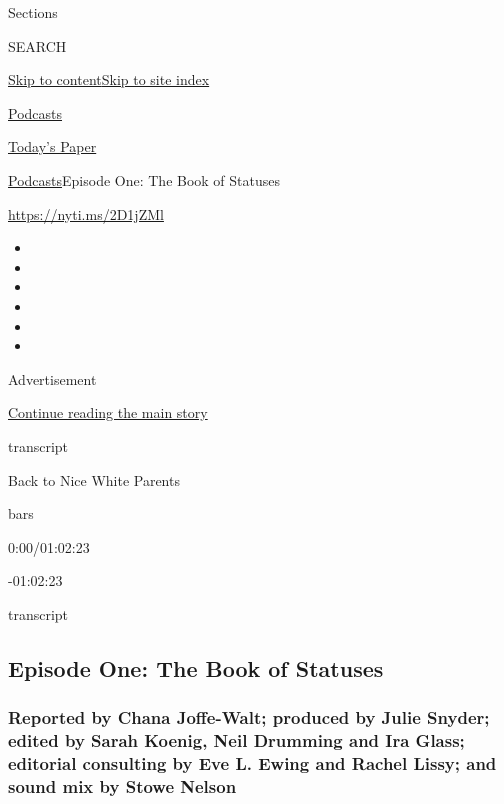 Sections

SEARCH

\protect\hyperlink{site-content}{Skip to
content}\protect\hyperlink{site-index}{Skip to site index}

\href{https://www.nytimes.com/spotlight/podcasts}{Podcasts}

\href{https://myaccount.nytimes.com/auth/login?response_type=cookie\&client_id=vi}{}

\href{https://www.nytimes.com/section/todayspaper}{Today's Paper}

\href{/spotlight/podcasts}{Podcasts}\textbar{}Episode One: The Book of
Statuses

\url{https://nyti.ms/2D1jZMl}

\begin{itemize}
\item
\item
\item
\item
\item
\item
\end{itemize}

Advertisement

\protect\hyperlink{after-top}{Continue reading the main story}

transcript

Back to Nice White Parents

bars

0:00/01:02:23

-01:02:23

transcript

\hypertarget{episode-one-the-book-of-statuses}{%
\subsection{Episode One: The Book of
Statuses}\label{episode-one-the-book-of-statuses}}

\hypertarget{reported-by-chana-joffe-walt-produced-by-julie-snyder-edited-by-sarah-koenig-neil-drumming-and-ira-glass-editorial-consulting-by-eve-l-ewing-and-rachel-lissy-and-sound-mix-by-stowe-nelson}{%
\subsubsection{Reported by Chana Joffe-Walt; produced by Julie Snyder;
edited by Sarah Koenig, Neil Drumming and Ira Glass; editorial
consulting by Eve L. Ewing and Rachel Lissy; and sound mix by Stowe
Nelson}\label{reported-by-chana-joffe-walt-produced-by-julie-snyder-edited-by-sarah-koenig-neil-drumming-and-ira-glass-editorial-consulting-by-eve-l-ewing-and-rachel-lissy-and-sound-mix-by-stowe-nelson}}

